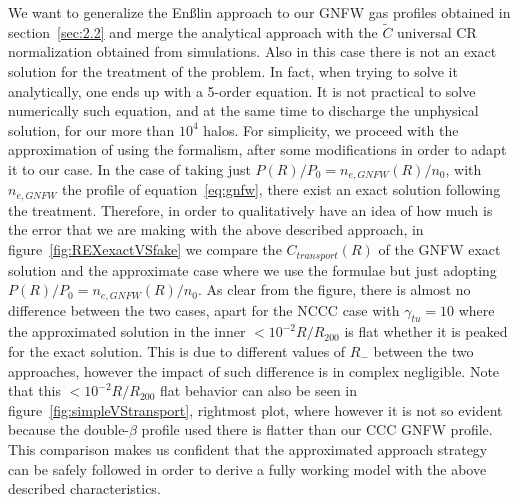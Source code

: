 \documentclass[traditabstract]{aa}
\begin{document}
\begin{appendix}
We want to generalize the En{\ss}lin approach to our GNFW gas profiles obtained in section~\ref{sec:2.2} and merge the \cite{2011A&A...527A..99E} analytical approach with the $\tilde{C}$ universal CR normalization obtained from simulations. Also in this case there is not an exact solution for the \cite{2011A&A...527A..99E} treatment of the problem. In fact, when trying to solve it analytically, one ends up with a 5-order equation. It is not practical to solve numerically such equation, and at the same time to discharge the unphysical solution, for our more than $10^4$ halos. For simplicity, we proceed with the approximation of using the \cite{2011A&A...527A..99E} formalism, after some modifications in order to adapt it to our case. In the case of taking just $P(R)/P_{0}=n_{e,GNFW}(R)/n_{0}$, with $n_{e,GNFW}$ the profile of equation~\ref{eq:gnfw}, there exist an exact solution following the  \cite{2011A&A...527A..99E} treatment. Therefore, in order to qualitatively have an idea of how much is the error that we are making with the above described approach, in figure~\ref{fig:REXexactVSfake} we compare the $C_{transport}(R)$ of the GNFW exact solution and the approximate case where we use the \cite{2011A&A...527A..99E} formulae but just adopting $P(R)/P_{0}=n_{e,GNFW}(R)/n_{0}$. As clear from the figure, there is almost no difference between the two cases, 
apart for the NCCC case with $\gamma_{tu}=10$ where the approximated solution in the inner $<10^{-2}R/R_{200}$ is flat whether it is peaked for the exact solution. This is due to different values of $R_{-}$ between the two approaches, however the impact of such difference is in complex negligible. Note that this $<10^{-2}R/R_{200}$ flat behavior can also be seen in figure~\ref{fig:simpleVStransport}, rightmost plot, where however it is not so evident because the double-$\beta$ profile used there is flatter than our CCC GNFW profile. This comparison makes us confident that the approximated approach strategy can be safely followed in order to derive a fully working model with the above described characteristics.


\end{appendix}
\end{document}
